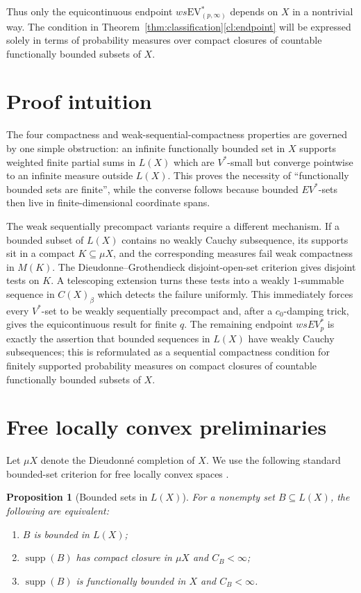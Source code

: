 \documentclass[11pt]{article}
\newtheorem{proposition}[theorem]{Proposition}
\newcommand{\supp}{\operatorname{supp}}
\newcommand{\EV}{\mathrm{EV}}
\begin{document}
Thus only the equicontinuous endpoint $ws\EV^*_{(p,\infty)}$ depends on $X$ in
a nontrivial way.  The condition in Theorem~\ref{thm:classification}\ref{cl:endpoint}
will be expressed solely in terms of probability measures over compact closures
of countable functionally bounded subsets of $X$.

\section*{Proof intuition}

The four compactness and weak-sequential-compactness properties are governed by
one simple obstruction: an infinite functionally bounded set in \(X\) supports
weighted finite partial sums in \(L(X)\) which are \(V^\ast\)-small but converge
pointwise to an infinite measure outside \(L(X)\).  This proves the necessity of
``functionally bounded sets are finite'', while the converse follows because
bounded \(EV^\ast\)-sets then live in finite-dimensional coordinate spans.

The weak sequentially precompact variants require a different mechanism.  If a
bounded subset of \(L(X)\) contains no weakly Cauchy subsequence, its supports
sit in a compact \(K\subseteq\mu X\), and the corresponding measures fail weak
compactness in \(M(K)\).  The Dieudonne--Grothendieck disjoint-open-set
criterion gives disjoint tests on \(K\).  A telescoping extension turns these
tests into a weakly \(1\)-summable sequence in \(C(X)_\beta\) which detects the
failure uniformly.  This immediately forces every \(V^\ast\)-set to be weakly
sequentially precompact and, after a \(c_0\)-damping trick, gives the
equicontinuous result for finite \(q\).  The remaining endpoint
\(wsEV^\ast_p\) is exactly the assertion that bounded sequences in \(L(X)\) have
weakly Cauchy subsequences; this is reformulated as a sequential compactness
condition for finitely supported probability measures on compact closures of
countable functionally bounded subsets of \(X\).

\section{Free locally convex preliminaries}

Let $\mu X$ denote the Dieudonn\'e completion of $X$.  We use the following
standard bounded-set criterion for free locally convex spaces
\cite[Proposition~2.7]{Gabriyelyan2019}.

\begin{proposition}[Bounded sets in $L(X)$]\label{prop:bounded}
For a nonempty set $B\subseteq L(X)$, the following are equivalent:
\begin{enumerate}[label=\textup{(\roman*)}]
\item $B$ is bounded in $L(X)$;
\item $\supp(B)$ has compact closure in $\mu X$ and $C_B<\infty$;
\item $\supp(B)$ is functionally bounded in $X$ and $C_B<\infty$.
\end{enumerate}
\end{proposition}
\end{document}
